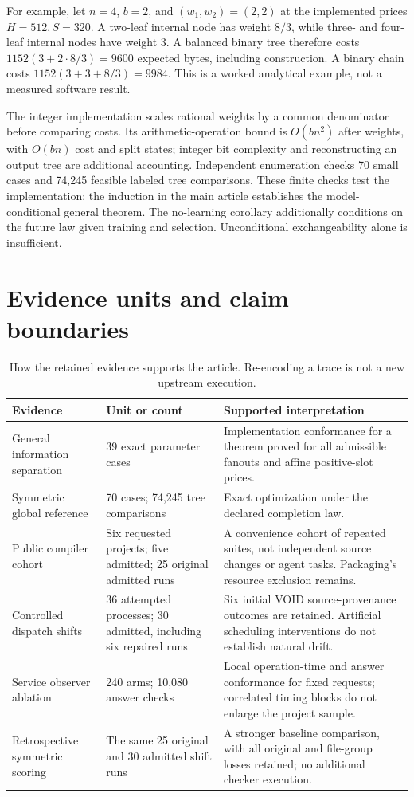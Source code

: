 \documentclass[10pt,letterpaper]{article}
\begin{document}
For example, let $n=4$, $b=2$, and $(w_1,w_2)=(2,2)$ at the implemented
prices $H=512,S=320$. A two-leaf internal node has weight $8/3$, while
three- and four-leaf internal nodes have weight $3$. A balanced binary
tree therefore costs $1152(3+2\cdot8/3)=9600$ expected bytes, including
construction. A binary chain costs $1152(3+3+8/3)=9984$. This is a
worked analytical example, not a measured software result.

The integer implementation scales rational weights by a common
denominator before comparing costs. Its arithmetic-operation bound is
$O(bn^2)$ after weights, with $O(bn)$ cost and split states; integer
bit complexity and reconstructing an output tree are additional accounting.
Independent enumeration checks 70 small cases and 74,245 feasible labeled
tree comparisons. These finite checks test the implementation; the induction
in the main article establishes the model-conditional general theorem.
The no-learning corollary additionally conditions on the future law given
training and selection. Unconditional exchangeability alone is insufficient.

\section{Evidence units and claim boundaries}
\begin{table}[htbp]
\centering\small
\caption{How the retained evidence supports the article. Re-encoding a
trace is not a new upstream execution.}
\begin{tabularx}{\linewidth}{@{}p{.25\linewidth}p{.25\linewidth}X@{}}
\toprule
Evidence & Unit or count & Supported interpretation\\\midrule
General information separation & 39 exact parameter cases &
Implementation conformance for a theorem proved for all admissible
fanouts and affine positive-slot prices.\\
Symmetric global reference & 70 cases; 74,245 tree comparisons &
Exact optimization under the declared completion law.\\
Public compiler cohort & Six requested projects; five admitted;
25 original admitted runs &
A convenience cohort of repeated suites, not independent source
changes or agent tasks. Packaging's resource exclusion remains.\\
Controlled dispatch shifts & 36 attempted processes; 30 admitted,
including six repaired runs &
Six initial VOID source-provenance outcomes are retained.
Artificial scheduling interventions do not establish natural drift.\\
Service observer ablation & 240 arms; 10,080 answer checks &
Local operation-time and answer conformance for fixed requests;
correlated timing blocks do not enlarge the project sample.\\
Retrospective symmetric scoring & The same 25 original and
30 admitted shift runs &
A stronger baseline comparison, with all original and file-group
losses retained; no additional checker execution.\\\bottomrule
\end{tabularx}
\end{table}
\end{document}
